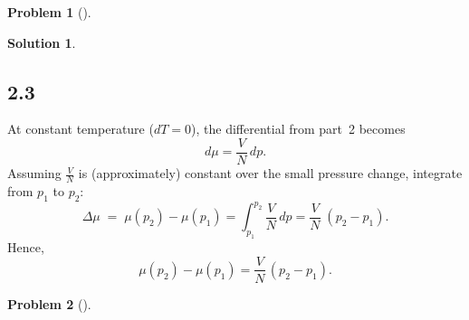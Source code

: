 \documentclass[12pt]{article}
\theoremstyle{definition} %
\newtheorem{solution}{Solution}
\newtheorem{problem}{Problem}
\theoremstyle{plain} %
\begin{document}
\begin{problem}[]
  
\end{problem}
\begin{solution}
  \subsection*{2.3}
  At constant temperature (\(dT=0\)), the differential from part 2 becomes
  \[
  d\mu = \frac{V}{N}\,dp.
  \]
  Assuming \(\tfrac{V}{N}\) is (approximately) constant over the small pressure change, integrate from \(p_1\) to \(p_2\):
  \[
  \Delta\mu \;=\; \mu(p_2)-\mu(p_1)
  =\int_{p_1}^{p_2}\frac{V}{N}\,dp
  =\frac{V}{N}\;(p_2 - p_1).
  \]
  Hence,
  \[
  \boxed{\mu(p_2)-\mu(p_1)=\frac{V}{N}\,(p_2-p_1).}
  \] 
\end{solution}
\begin{problem}[]
  
\end{problem}
\end{document}
